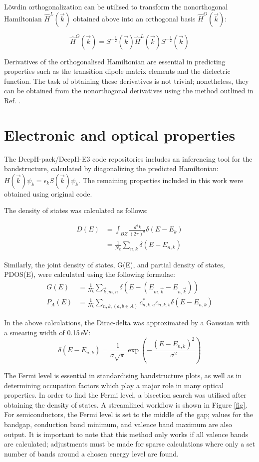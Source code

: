 \documentclass[11pt,a4paper,twoside]{report}  %
\numberwithin{equation}{section}					%
\numberwithin{figure}{section}						%
\begin{document}
L\"{o}wdin orthogonalization can be utilised to transform the nonorthogonal Hamiltonian $\hat H^L(\vec k)$ obtained above into an orthogonal basis $\hat H^O(\vec k)$:

\begin{equation}
\hat H^O(\vec k) = S^{-\frac12}(\vec k) \hat H^L(\vec k)S^{-\frac12}(\vec k)
\end{equation}

Derivatives of the orthogonalised Hamiltonian are essential in predicting properties such as the transition dipole matrix elements and the dielectric function. The task of obtaining these derivatives is not trivial; nonetheless, they can be obtained from the nonorthogonal derivatives using the method outlined in Ref. \cite{wangFirstprinciplesCalculationOptical2019}. 

\section{Electronic and optical properties}

The DeepH-pack/DeepH-E3 code repositories includes an inferencing tool for the bandstructure, calculated by diagonalizing the predicted Hamiltonian: $H(\vec k)\psi_k = \epsilon_k S(\vec k)\psi_k$. The remaining properties included in this work were obtained using original code. 

The density of states was calculated as follows:

\begin{align}D(E) &= \int_{BZ} \frac{d^dk}{(2\pi)^d}\delta(E-E_k)\\ &= \frac1{N_k}\sum_{n,k}\delta(E-E_{n,k})\end{align}

Similarly, the joint density of states, G(E), and partial density of states, PDOS(E), were calculated using the following formulae: \begin{align}
G(E) &= \frac1{N_k}\sum_{\vec k, m, n} \delta(E-(E_{m,\vec k}-E_{n,\vec k})) \label{equation:jdos}\\ P_A(E) &= \frac1{N_k}\sum_{n,k, (a,b \in A)} c_{n,k,a}^*c_{n,k,b} \delta(E-E_{n,k})\end{align}

In the above calculations, the Dirac-delta was approximated by a Gaussian with a smearing width of 0.15\,eV: $$\delta(E-E_{n,k}) = \frac{1}{\sigma\sqrt{\pi}}\exp(-\frac{(E-E_{n,k})^2}{\sigma^2})$$

The Fermi level is essential in standardising bandstructure plots, as well as in determining occupation factors which play a major role in many optical properties. In order to find the Fermi level, a bisection search was utilised after obtaining the density of states. A streamlined workflow is shown in Figure \ref{fig}. For semiconductors, the Fermi level is set to the middle of the gap; values for the bandgap, conduction band minimum, and valence band maximum are also output. It is important to note that this method only works if all valence bands are calculated; adjustments must be made for sparse calculations where only a set number of bands around a chosen energy level are found.
\end{document}
